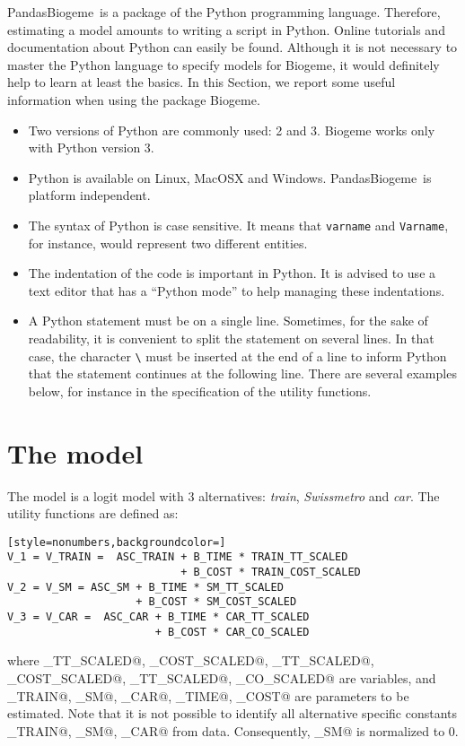 \documentclass[12pt,a4paper]{article}
\newcommand{\PDBIOGEME}{PandasBiogeme}
\begin{document}
\PDBIOGEME\ is a package of the Python programming
language. Therefore, estimating a model amounts to writing a script in
 Python. Online tutorials and  documentation about Python can easily be found. Although it
is not necessary to master the Python language to specify models for
Biogeme, it would definitely help to learn at least the basics. In
this Section, we report some useful information when using the package
Biogeme.
\begin{itemize}
\item Two versions of Python are commonly used: 2 and 3. Biogeme works only
  with Python version 3.
 \item Python is available on Linux, MacOSX and
   Windows. \PDBIOGEME\ is platform independent. 
\item The syntax of Python is case sensitive. It means that
\verb+varname+ and \verb+Varname+, for instance, would represent two
different entities.
\item The indentation of the code is important in Python. It is
  advised to use a text editor that has a ``Python mode'' to help
  managing these indentations.
 \item A Python statement must be on a single line. Sometimes, for the
   sake of readability, it is convenient to split the statement on
   several lines. In that case, the character \lstinline+\+ must be
   inserted at the end of a line to inform Python that the statement
   continues at the following line. There are several examples below,
   for instance in the specification of the utility functions.
\end{itemize}

\section{The model}
The model is a logit model with 3 alternatives: \emph{train}, \emph{Swissmetro} and \emph{car}. The utility functions are defined as:
\begin{lstlisting}[style=nonumbers,backgroundcolor=]
V_1 = V_TRAIN =  ASC_TRAIN + B_TIME * TRAIN_TT_SCALED 
                           + B_COST * TRAIN_COST_SCALED
V_2 = V_SM = ASC_SM + B_TIME * SM_TT_SCALED 
                    + B_COST * SM_COST_SCALED
V_3 = V_CAR =  ASC_CAR + B_TIME * CAR_TT_SCALED 
                       + B_COST * CAR_CO_SCALED
\end{lstlisting}
where 
\lstinline@TRAIN_TT_SCALED@,
\lstinline@TRAIN_COST_SCALED@,
\lstinline@SM_TT_SCALED@,
\lstinline@SM_COST_SCALED@,
\lstinline@CAR_TT_SCALED@,
\lstinline@CAR_CO_SCALED@
are variables, and 
  \lstinline@ASC_TRAIN@,
  \lstinline@ASC_SM@,
  \lstinline@ASC_CAR@,
  \lstinline@B_TIME@,
  \lstinline@B_COST@ are parameters to be estimated. Note that it is not possible to identify all alternative specific constants  
  \lstinline@ASC_TRAIN@,
  \lstinline@ASC_SM@,
  \lstinline@ASC_CAR@ from data. Consequently,  \lstinline@ASC_SM@
  is normalized to 0. 
\end{document}
